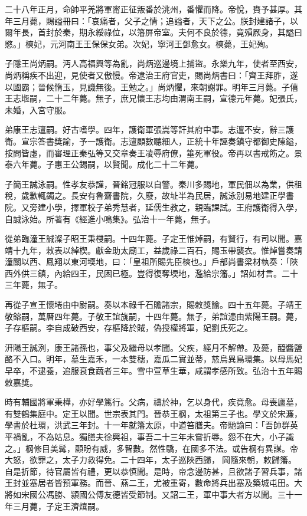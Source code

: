 二十八年正月，命帥平羌將軍甯正征叛番於洮州，番懼而降。帝悅，賚予甚厚。其年三月薨，賜謚冊曰：「哀痛者，父子之情；追謚者，天下之公。朕封建諸子，以爾年長，首封於秦，期永綏祿位，以籓屏帝室。夫何不良於德，竟殞厥身，其謚曰愍。」樉妃，元河南王王保保女弟。次妃，寧河王鄧愈女。樉薨，王妃殉。

子隱王尚炳嗣。沔人高福興等為亂，尚炳巡邊境上捕盜。永樂九年，使者至西安，尚炳稱疾不出迎，見使者又傲慢。帝逮治王府官吏，賜尚炳書曰：「齊王拜胙，遂以國霸；晉候惰玉，見譏無後。王勉之。」尚炳懼，來朝謝罪。明年三月薨。子僖王志堩嗣，二十二年薨。無子，庶兄懷王志均由渭南王嗣，宣德元年薨。妃張氏，未婚，入宮守服。

弟康王志邅嗣。好古嗜學。四年，護衛軍張嵩等訐其府中事。志邅不安，辭三護衛。宣宗答書獎諭，予一護衛。志邅顧數聽細人，正統十年誣奏鎮守都御史陳鎰，按問皆虛，而審理正秦弘等又交章奏王凌辱府僚，箠死軍役。帝再以書戒飭之。景泰六年薨。子惠王公錫嗣，以賢聞。成化二十二年薨。

子簡王誠泳嗣。性孝友恭謹，晉銘冠服以自警。秦川多賜地，軍民佃以為業，供租稅，歲歉輒蠲之。長安有魯齋書院，久廢，故址半為民居，誠泳別易地建正學書院。又旁建小學，擇軍校子弟秀慧者，延儒生教之，親臨課試。王府護衛得入學，自誠泳始。所著有《經進小鳴集》。弘治十一年薨，無子。

從弟臨潼王誠澯子昭王秉欆嗣。十四年薨。子定王惟焯嗣，有賢行，有司以聞。嘉靖十九年，敕表以綽楔。獻金助太廟工，益歲祿二百石，賜玉帶襲衣。惟焯嘗奏請潼關以西、鳳翔以東河堧地，曰：「皇祖所賜先臣樉也。」戶部尚書梁材執奏：「陜西外供三鎮，內給四王，民困已極。豈得復奪堧地，濫給宗籓。」詔如材言。二十三年薨，無子。

再從子宣王懷埢由中尉嗣。奏以本祿千石贍諸宗，賜敕獎諭。四十五年薨。子靖王敬鎔嗣，萬曆四年薨。子敬王誼旐嗣，十四年薨。無子，弟誼漶由紫陽王嗣。薨，子存樞嗣。李自成破西安，存樞降於賊，偽授權將軍，妃劉氏死之。

汧陽王誠洌，康王諸孫也，事父及繼母以孝聞。父疾，經月不解帶。及薨，醯醬鹽酪不入口。明年，墓生嘉禾，一本雙穗，嘉瓜二實並蒂，慈烏異鳥環集。以母馬妃早卒，不逮養，追服衰食蔬者三年。雪中萱草生華，咸謂孝感所致。弘治十五年賜敕嘉獎。

時有輔國將軍秉樺，亦好學篤行。父病，禱於神，乞以身代，疾竟愈。母喪廬墓，有雙鶴集庭中。定王以聞。世宗表其門。晉恭王㭎，太祖第三子也。學文於宋濂，學書於杜環，洪武三年封。十一年就籓太原，中道笞膳夫。帝馳諭曰：「吾帥群英平禍亂，不為姑息。獨膳夫徐興祖，事吾二十三年未嘗折辱。怨不在大，小子識之。」㭎修目美髯，顧盼有威，多智數。然性驕，在國多不法。或告㭎有異謀。帝大怒，欲罪之，太子力救得免。二十四年，太子巡陜西歸，岡隨來朝，敕歸籓。自是折節，待官屬皆有禮，更以恭慎聞。是時，帝念邊防甚，且欲諸子習兵事，諸王封並塞居者皆預軍務。而晉、燕二王，尤被重寄，數命將兵出塞及築城屯田。大將如宋國公馮勝、潁國公傅友德皆受節制。又詔二王，軍中事大者方以聞。三十一年三月薨，子定王濟熺嗣。

